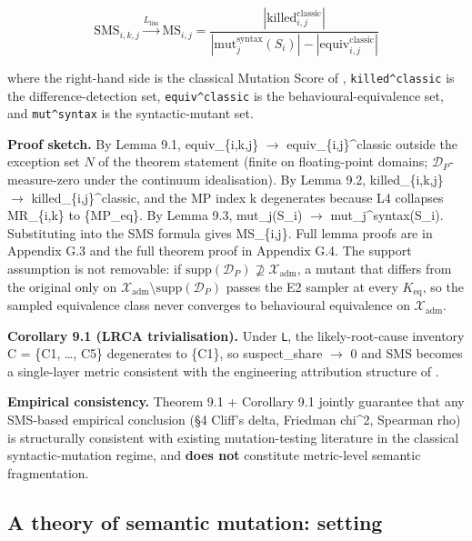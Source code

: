 \documentclass[manuscript,screen,review]{acmart}
\begin{document}
\[ \mathrm{SMS}_{i,k,j} \xrightarrow{L_{\mathrm{lim}}} \mathrm{MS}_{i,j} = \frac{|\mathrm{killed}_{i,j}^{\mathrm{classic}}|}{|\mathrm{mut}_j^{\mathrm{syntax}}(S_i)| - |\mathrm{equiv}_{i,j}^{\mathrm{classic}}|} \]

where the right-hand side is the classical Mutation Score of
\citet{d7c38286734419b52de4262c9802ebdfcf4b9447}, \texttt{killed\^{}classic} is the difference-detection
set, \texttt{equiv\^{}classic} is the behavioural-equivalence set, and
\texttt{mut\^{}syntax} is the syntactic-mutant set.

\textbf{Proof sketch.} By Lemma 9.1, equiv\_\{i,k,j\} $\to$
equiv\_\{i,j\}\^{}classic outside the exception set $N$ of the theorem
statement (finite on floating-point domains;
$\mathcal{D}_P$-measure-zero under the continuum idealisation). By
Lemma 9.2, killed\_\{i,k,j\} $\to$
killed\_\{i,j\}\^{}classic, and the MP index k degenerates because L4
collapses MR\_\{i,k\} to \{MP\_eq\}. By Lemma 9.3, mut\_j(S\_i) $\to$
mut\_j\^{}syntax(S\_i). Substituting into the SMS formula gives
MS\_\{i,j\}. Full lemma proofs are in Appendix G.3 and the full theorem
proof in Appendix G.4. The support assumption is not removable: if
$\mathrm{supp}(\mathcal{D}_P) \not\supseteq \mathcal{X}_{\mathrm{adm}}$,
a mutant that differs from the original only on
$\mathcal{X}_{\mathrm{adm}} \setminus \mathrm{supp}(\mathcal{D}_P)$
passes the E2 sampler at every $K_{\mathrm{eq}}$, so the sampled
equivalence class never converges to behavioural equivalence on
$\mathcal{X}_{\mathrm{adm}}$.

\textbf{Corollary 9.1 (LRCA trivialisation).} Under \texttt{L}, the
likely-root-cause inventory C = \{C1, \ldots, C5\} degenerates to
\{C1\}, so suspect\_share $\to$ 0 and SMS becomes a single-layer metric
consistent with the engineering attribution structure of
\citet{d7c38286734419b52de4262c9802ebdfcf4b9447}.

\textbf{Empirical consistency.} Theorem 9.1 + Corollary 9.1 jointly
guarantee that any SMS-based empirical conclusion (§4 Cliff's delta,
Friedman chi\^{}2, Spearman rho) is structurally consistent with
existing mutation-testing literature in the classical syntactic-mutation
regime, and \textbf{does not} constitute metric-level semantic
fragmentation.


\subsection{A theory of semantic mutation: setting}\label{theory-setting}
\end{document}
